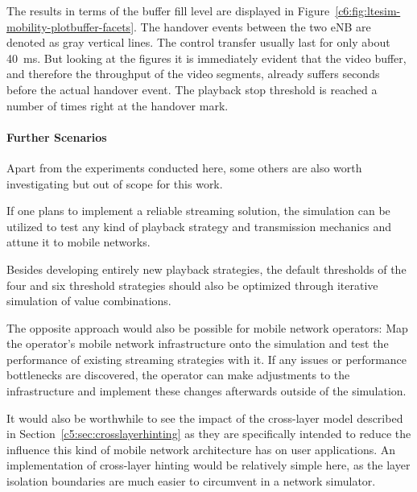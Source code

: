 The results in terms of the buffer fill level are displayed in Figure~\ref{c6:fig:ltesim-mobility-plotbuffer-facets}. The handover events between the two \gls{eNB} are denoted as gray vertical lines. The control transfer usually last for only about \SI{40}{\milli\second}. But looking at the figures it is immediately evident that the video buffer, and therefore the throughput of the video segments, already suffers seconds before the actual handover event. The playback stop threshold is reached a number of times right at the handover mark.


\paragraph{Further Scenarios}

Apart from the experiments conducted here, some others are also worth investigating but out of scope for this work.

If one plans to implement a reliable streaming solution, the simulation can be utilized to test any kind of playback strategy and transmission mechanics and attune it to mobile networks. 

Besides developing entirely new playback strategies, the default thresholds of the four and six threshold strategies should also be optimized through iterative simulation of value combinations.

The opposite approach would also be possible for mobile network operators: Map the operator's mobile network infrastructure onto the simulation and test the performance of existing streaming strategies with it. If any issues or performance bottlenecks are discovered, the operator can make adjustments to the infrastructure and implement these changes afterwards outside of the simulation.

It would also be worthwhile to see the impact of the cross-layer model described in Section~\ref{c5:sec:crosslayerhinting} as they are specifically intended to reduce the influence this kind of mobile network architecture has on user applications. An implementation of cross-layer hinting would be relatively simple here, as the layer isolation boundaries are much easier to circumvent in a network simulator.

